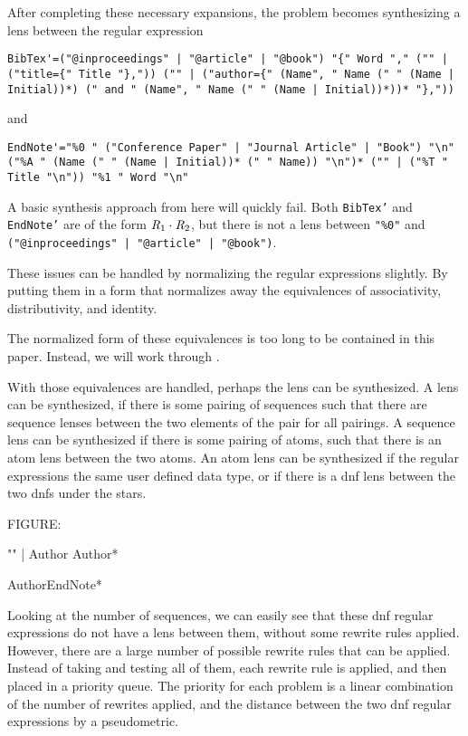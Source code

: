 After completing these necessary expansions, the problem becomes synthesizing a
lens between the regular expression
\begin{lstlisting}
BibTex'=("@inproceedings" | "@article" | "@book") "{" Word "," ("" | ("title={" Title "},")) ("" | ("author={" (Name", " Name (" " (Name | Initial))*) (" and " (Name", " Name (" " (Name | Initial))*))* "},"))
\end{lstlisting}
and
\begin{lstlisting}
EndNote'="%0 " ("Conference Paper" | "Journal Article" | "Book") "\n" ("%A " (Name (" " (Name | Initial))* (" " Name)) "\n")* ("" | ("%T " Title "\n")) "%1 " Word "\n"
\end{lstlisting}

A basic synthesis approach from here will quickly fail.  Both \texttt{BibTex'}
and \texttt{EndNote'} are of the form $\mathit{R}_1\cdot\mathit{R}_2$, but there is
not a lens between \texttt{"\%0"} and
\texttt{("@inproceedings" | "@article" | "@book")}.

These issues can be handled by normalizing the regular expressions slightly.
By putting them in a form that normalizes away the equivalences of
associativity, distributivity, and \EmptyString{} identity.

The normalized form of these equivalences is too long to be contained in this
paper.  Instead, we will work through .

With those equivalences are handled, perhaps the lens can be synthesized.
A lens can be synthesized, if there is some pairing of sequences such that
there are sequence lenses between the two elements of the pair for all pairings.
A sequence lens can be synthesized if there is some pairing of atoms, such that
there is an atom lens between the two atoms.  An atom lens can be synthesized
if the regular expressions the same user defined data type, or if there is a dnf
lens between the two dnfs under the stars.

FIGURE:

"" | Author Author*

AuthorEndNote*

Looking at the number of sequences, we can easily see that these dnf regular
expressions do not have a lens between them, without some rewrite rules applied.
However, there are a large number of possible rewrite rules that can be applied.
Instead of taking and testing all of them, each rewrite rule is applied, and
then placed in a priority queue.
The priority for each problem is a linear combination of the number of rewrites
applied, and the distance between the two dnf regular expressions by a
pseudometric.

